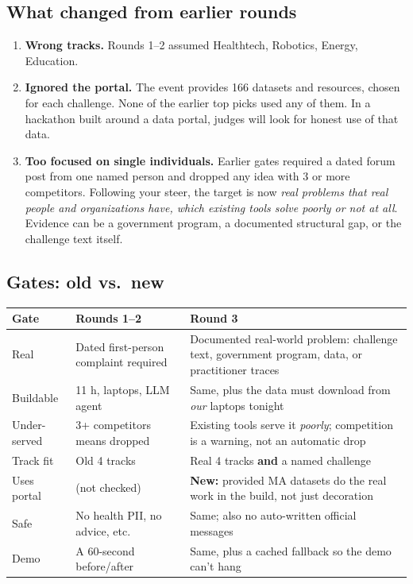 \documentclass[11pt]{article}
\begin{document}
\subsection{What changed from earlier rounds}
\begin{enumerate}
\item \textbf{Wrong tracks.} Rounds 1--2 assumed Healthtech, Robotics, Energy, Education.
\item \textbf{Ignored the portal.} The event provides 166 datasets and resources, chosen for
  each challenge. None of the earlier top picks used any of them. In a hackathon built
  around a data portal, judges will look for honest use of that data.
\item \textbf{Too focused on single individuals.} Earlier gates required a dated forum post
  from one named person and dropped any idea with 3 or more competitors. Following your
  steer, the target is now \emph{real problems that real people and organizations have, which
  existing tools solve poorly or not at all}. Evidence can be a government program, a
  documented structural gap, or the challenge text itself.
\end{enumerate}

\subsection{Gates: old vs.\ new}
\begin{longtable}{@{}L{2.6cm} L{6.0cm} L{6.4cm}@{}}
\toprule
\textbf{Gate} & \textbf{Rounds 1--2} & \textbf{Round 3}\\
\midrule
\endhead
Real & Dated first-person complaint required & Documented real-world problem: challenge text, government program, data, or practitioner traces\\
Buildable & 11 h, laptops, LLM agent & Same, plus the data must download from \emph{our} laptops tonight\\
Under-served & 3+ competitors means dropped & Existing tools serve it \emph{poorly}; competition is a warning, not an automatic drop\\
Track fit & Old 4 tracks & Real 4 tracks \textbf{and} a named challenge\\
Uses portal & (not checked) & \textbf{New:} provided MA datasets do the real work in the build, not just decoration\\
Safe & No health PII, no advice, etc. & Same; also no auto-written official messages\\
Demo & A 60-second before/after & Same, plus a cached fallback so the demo can't hang\\
\bottomrule
\end{longtable}
\end{document}
